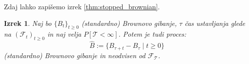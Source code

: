 \documentclass[11pt]{article}
\theoremstyle{definition}
\theoremstyle{plain}
\newtheorem{izrek}{Izrek}
\begin{document}
    Zdaj lahko zapišemo izrek \ref{thm:stopped_brownian}. %
    
    \begin{izrek}
    Naj bo \(\{B_t\}_{t \geq 0}\) (standardno) Brownovo gibanje, \(\tau\) čas ustavljanja glede na
    $(\mathcal{F}_t)_{t\geq0}$ in naj velja $P[{\scriptscriptstyle\mathcal{T}}<\infty]$.
    Potem je tudi proces:
    \[
    \hat{B} := \{B_{\tau+t} - B_\tau \mid t \geq 0\}
    \]
    (standardno) Brownovo gibanje in neodvisen od $\mathcal{F}_\mathcal{T}$.
    \end{izrek}
    
    

    
\end{document}
